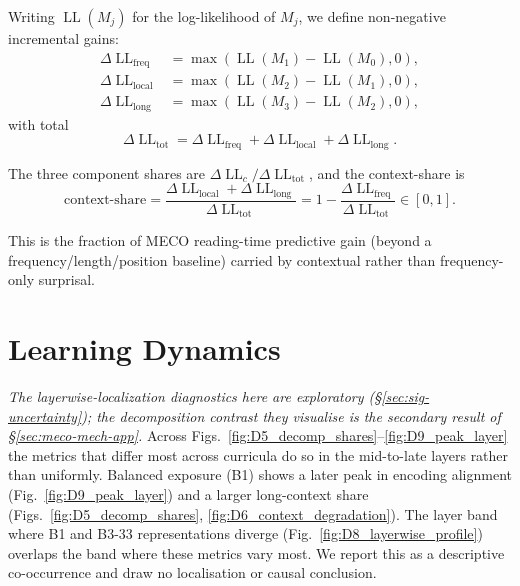 Writing $\operatorname{LL}(M_j)$ for the log-likelihood of $M_j$, we define non-negative incremental gains:
\begin{align*}
\Delta \operatorname{LL}_{\mathrm{freq}}  &= \max(\operatorname{LL}(M_1) - \operatorname{LL}(M_0), 0), \\
\Delta \operatorname{LL}_{\mathrm{local}} &= \max(\operatorname{LL}(M_2) - \operatorname{LL}(M_1), 0), \\
\Delta \operatorname{LL}_{\mathrm{long}}  &= \max(\operatorname{LL}(M_3) - \operatorname{LL}(M_2), 0),
\end{align*}
with total
\[
\Delta \operatorname{LL}_{\mathrm{tot}} =
\Delta \operatorname{LL}_{\mathrm{freq}} +
\Delta \operatorname{LL}_{\mathrm{local}} +
\Delta \operatorname{LL}_{\mathrm{long}}.
\]
 
The three component shares are $\Delta \operatorname{LL}_c / \Delta \operatorname{LL}_{\mathrm{tot}}$, and the context-share is
\[
\mathrm{context\text{-}share}
= \frac{\Delta \operatorname{LL}_{\mathrm{local}} + \Delta \operatorname{LL}_{\mathrm{long}}}
       {\Delta \operatorname{LL}_{\mathrm{tot}}}
= 1 - \frac{\Delta \operatorname{LL}_{\mathrm{freq}}}{\Delta \operatorname{LL}_{\mathrm{tot}}}
\in [0,1].
\]
 
This is the fraction of MECO reading-time predictive gain (beyond a frequency/length/position baseline) carried by contextual rather than frequency-only surprisal.
 
\section{Learning Dynamics}\label{sec:appx-dynamics}
 
\emph{The layerwise-localization diagnostics here are exploratory (\S\ref{sec:sig-uncertainty}); the decomposition contrast they visualise is the secondary result of \S\ref{sec:meco-mech-app}.} Across Figs.~\ref{fig:D5_decomp_shares}--\ref{fig:D9_peak_layer} the metrics that differ most across curricula do so in the mid-to-late layers rather than uniformly. Balanced exposure (B1) shows a later peak in encoding alignment (Fig.~\ref{fig:D9_peak_layer}) and a larger long-context share (Figs.~\ref{fig:D5_decomp_shares}, \ref{fig:D6_context_degradation}). The layer band where B1 and B3-33 representations diverge (Fig.~\ref{fig:D8_layerwise_profile}) overlaps the band where these metrics vary most. We report this as a descriptive co-occurrence and draw no localisation or causal conclusion.
 
